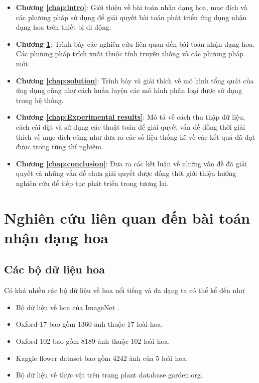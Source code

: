 \documentclass[12pt]{report}
\begin{document}
																																																						
		\begin{itemize}
			\item \textbf{Chương \ref{chap:intro}}: Giới thiệu về bài toán nhận dạng hoa, mục đích và các phương pháp sử dụng để giải quyết bài toán phát triển ứng dụng nhận dạng hoa trên thiết bị di động.
			\item \textbf{Chương \ref{chap:background}}: Trình bày các nghiên cứu liên quan đến bài toán nhận dạng hoa. Các phương pháp trích xuất thuộc tính truyền thống và các phương pháp mới.
			\item \textbf{Chương \ref{chap:solution}}: Trình bày và giải thích về mô hình tổng quát của ứng dụng cũng như cách huấn luyện các mô hình phân loại được sử dụng trong hệ thống.
			\item \textbf{Chương \ref{chap:Experimental results}}: Mô tả về cách thu thập dữ liệu, cách cài đặt và sử dụng các thuật toán để giải quyết vấn đề đồng thời giải thích về mục đích cũng như đưa ra các số liệu thống kê về các kết quả đã đạt được trong từng thí nghiệm. 
			\item \textbf{Chương \ref{chap:conclusion}}: Đưa ra các kết luận về những vấn đề đã giải quyết và những vấn đề chưa giải quyết được đồng thời giới thiệu hướng nghiên cứu để tiếp tục phát triển trong tương lai.	      
		\end{itemize}
																																																								
																																																				
																																																						
																																																						
		\newpage	
		\chapter{Nghiên cứu liên quan đến bài toán nhận dạng hoa}
		\label{chap:background}
																																																										
																																																												
		\section{Các bộ dữ liệu hoa}
		Có khá nhiều các bộ dữ liệu về hoa nổi tiếng và đa dạng ta có thể kể đến như	
		\begin{itemize}
			\item Bộ dữ liệu về hoa của ImageNet \cite{cia_imagenet}.
			\item Oxford-17 \cite{cia-Nilsback06} bao gồm 1360 ảnh thuộc 17 loài hoa.
			\item Oxford-102 \cite{cia-Nilsback06} bao gồm 8189 ảnh thuộc 102 loài hoa. 
			\item Kaggle flower dataset \cite{cia_kaggle_flower} bao gồm 4242 ảnh của 5 loài hoa.
			\item Bộ dữ liệu về thực vật trên trang plant database garden.org.
		\end{itemize}		
																																																								
\end{document}

